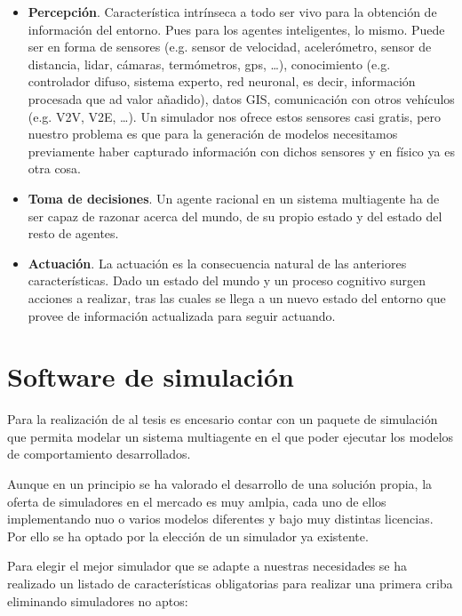 {\begin{itemize}
	\item \textbf{Percepción}. Característica intrínseca a todo ser vivo para la obtención de información del entorno. Pues para los agentes inteligentes, lo mismo. Puede ser en forma de sensores (e.g. sensor de velocidad, acelerómetro, sensor de distancia, lidar, cámaras, termómetros, gps, \ldots), conocimiento (e.g. controlador difuso, sistema experto, red neuronal, es decir, información procesada que ad valor añadido), datos GIS, comunicación con otros vehículos (e.g. V2V, V2E, \ldots). Un simulador nos ofrece estos sensores casi gratis, pero nuestro problema es que para la generación de modelos necesitamos previamente haber capturado información con dichos sensores y en físico ya es otra cosa.
	\item \textbf{Toma de decisiones}. Un agente racional en un sistema multiagente ha de ser capaz de razonar acerca del mundo, de su propio estado y del estado del resto de agentes.
	\item \textbf{Actuación}. La actuación es la consecuencia natural de las anteriores características. Dado un estado del mundo y un proceso cognitivo surgen acciones a realizar, tras las cuales se llega a un nuevo estado del entorno que provee de información actualizada para seguir actuando.
\end{itemize}

\section{Software de simulación}

Para la realización de al tesis es encesario contar con un paquete de simulación que permita modelar un sistema multiagente en el que poder ejecutar los modelos de comportamiento desarrollados.

Aunque en un principio se ha valorado el desarrollo de una solución propia, la oferta de simuladores en el mercado es muy amlpia, cada uno de ellos implementando nuo o varios modelos diferentes y bajo muy distintas licencias. Por ello se ha optado por la elección de un simulador ya existente.

Para elegir el mejor simulador que se adapte a nuestras necesidades se ha realizado un listado de características obligatorias para realizar una primera criba eliminando simuladores no aptos:

}
